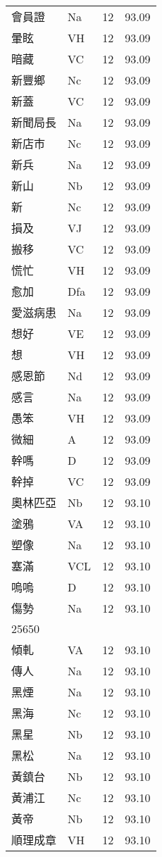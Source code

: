 \documentclass[twocolumn]{book}
\begin{document}
\begin{supertabular}{llrr}
會員證 & Na & 12 &  93.09\\
暈眩 & VH & 12 &  93.09\\
暗藏 & VC & 12 &  93.09\\
新豐鄉 & Nc & 12 &  93.09\\
新蓋 & VC & 12 &  93.09\\
新聞局長 & Na & 12 &  93.09\\
新店市 & Nc & 12 &  93.09\\
新兵 & Na & 12 &  93.09\\
新山 & Nb & 12 &  93.09\\
新 & Nc & 12 &  93.09\\
損及 & VJ & 12 &  93.09\\
搬移 & VC & 12 &  93.09\\
慌忙 & VH & 12 &  93.09\\
愈加 & Dfa & 12 &  93.09\\
愛滋病患 & Na & 12 &  93.09\\
想好 & VE & 12 &  93.09\\
想 & VH & 12 &  93.09\\
感恩節 & Nd & 12 &  93.09\\
感言 & Na & 12 &  93.09\\
愚笨 & VH & 12 &  93.09\\
微細 & A & 12 &  93.09\\
幹嗎 & D & 12 &  93.09\\
幹掉 & VC & 12 &  93.09\\
奧林匹亞 & Nb & 12 &  93.10\\
塗鴉 & VA & 12 &  93.10\\
塑像 & Na & 12 &  93.10\\
塞滿 & VCL & 12 &  93.10\\
嗚嗚 & D & 12 &  93.10\\
傷勢 & Na & 12 &  93.10\\
25650\\
傾軋 & VA & 12 &  93.10\\
傳人 & Na & 12 &  93.10\\
黑煙 & Na & 12 &  93.10\\
黑海 & Nc & 12 &  93.10\\
黑星 & Nb & 12 &  93.10\\
黑松 & Na & 12 &  93.10\\
黃鎮台 & Nb & 12 &  93.10\\
黃浦江 & Nc & 12 &  93.10\\
黃帝 & Nb & 12 &  93.10\\
順理成章 & VH & 12 &  93.10\\

\end{supertabular}
\end{document}
